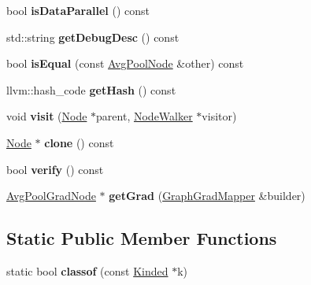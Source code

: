 \begin{DoxyCompactItemize}
bool {\bfseries is\+Data\+Parallel} () const
\item 
\mbox{\label{classglow_1_1_avg_pool_node_afa689e1eefaf22fd476942b64009f0c9}} 
std\+::string {\bfseries get\+Debug\+Desc} () const
\item 
\mbox{\label{classglow_1_1_avg_pool_node_aa88969ea6a22a1b426e584206e6b74b4}} 
bool {\bfseries is\+Equal} (const \hyperlink{classglow_1_1_avg_pool_node}{Avg\+Pool\+Node} \&other) const
\item 
\mbox{\label{classglow_1_1_avg_pool_node_ad8eca2c4d755c4872e79e97d95fbb5f8}} 
llvm\+::hash\+\_\+code {\bfseries get\+Hash} () const
\item 
\mbox{\label{classglow_1_1_avg_pool_node_a507374e1669856f68eca9a7af972d039}} 
void {\bfseries visit} (\hyperlink{classglow_1_1_node}{Node} $\ast$parent, \hyperlink{classglow_1_1_node_walker}{Node\+Walker} $\ast$visitor)
\item 
\mbox{\label{classglow_1_1_avg_pool_node_abd95d5b96b4d2a909b709804af3a4f43}} 
\hyperlink{classglow_1_1_node}{Node} $\ast$ {\bfseries clone} () const
\item 
\mbox{\label{classglow_1_1_avg_pool_node_ac2a78a56bfdfb9d91a69614524633158}} 
bool {\bfseries verify} () const
\item 
\mbox{\label{classglow_1_1_avg_pool_node_aa70479c27da646c338e4e04b021435c9}} 
\hyperlink{classglow_1_1_avg_pool_grad_node}{Avg\+Pool\+Grad\+Node} $\ast$ {\bfseries get\+Grad} (\hyperlink{classglow_1_1_graph_grad_mapper}{Graph\+Grad\+Mapper} \&builder)
\end{DoxyCompactItemize}
\subsection*{Static Public Member Functions}
\begin{DoxyCompactItemize}
\item 
\mbox{\label{classglow_1_1_avg_pool_node_a00ecd552a2a99e38b38a0b2659d0f30e}} 
static bool {\bfseries classof} (const \hyperlink{classglow_1_1_kinded}{Kinded} $\ast$k)
\end{DoxyCompactItemize}
